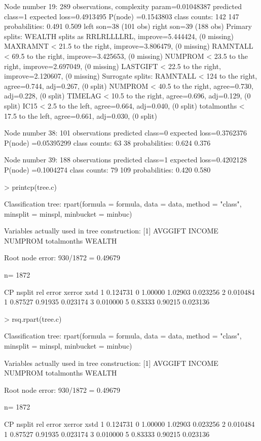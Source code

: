 \documentclass{article}
\begin{document}
\begin{Schunk}
\begin{Soutput}
Node number 19: 289 observations,    complexity param=0.01048387
  predicted class=1  expected loss=0.4913495  P(node) =0.1543803
    class counts:   142   147
   probabilities: 0.491 0.509 
  left son=38 (101 obs) right son=39 (188 obs)
  Primary splits:
      WEALTH   splits as  RRLRLLLLRL,   improve=5.444424, (0 missing)
      MAXRAMNT < 21.5     to the right, improve=3.806479, (0 missing)
      RAMNTALL < 69.5     to the right, improve=3.425653, (0 missing)
      NUMPROM  < 23.5     to the right, improve=2.697049, (0 missing)
      LASTGIFT < 22.5     to the right, improve=2.120607, (0 missing)
  Surrogate splits:
      RAMNTALL    < 124      to the right, agree=0.744, adj=0.267, (0 split)
      NUMPROM     < 40.5     to the right, agree=0.730, adj=0.228, (0 split)
      TIMELAG     < 10.5     to the right, agree=0.696, adj=0.129, (0 split)
      IC15        < 2.5      to the left,  agree=0.664, adj=0.040, (0 split)
      totalmonths < 17.5     to the left,  agree=0.661, adj=0.030, (0 split)

Node number 38: 101 observations
  predicted class=0  expected loss=0.3762376  P(node) =0.05395299
    class counts:    63    38
   probabilities: 0.624 0.376 

Node number 39: 188 observations
  predicted class=1  expected loss=0.4202128  P(node) =0.1004274
    class counts:    79   109
   probabilities: 0.420 0.580 
\end{Soutput}
\begin{Sinput}
> printcp(tree.c)
\end{Sinput}
\begin{Soutput}
Classification tree:
rpart(formula = formula, data = data, method = "class", minsplit = minspl, 
    minbucket = minbuc)

Variables actually used in tree construction:
[1] AVGGIFT     INCOME      NUMPROM     totalmonths WEALTH     

Root node error: 930/1872 = 0.49679

n= 1872 

        CP nsplit rel error  xerror     xstd
1 0.124731      0   1.00000 1.02903 0.023256
2 0.010484      1   0.87527 0.91935 0.023174
3 0.010000      5   0.83333 0.90215 0.023136
\end{Soutput}
\begin{Sinput}
> rsq.rpart(tree.c)
\end{Sinput}
\begin{Soutput}
Classification tree:
rpart(formula = formula, data = data, method = "class", minsplit = minspl, 
    minbucket = minbuc)

Variables actually used in tree construction:
[1] AVGGIFT     INCOME      NUMPROM     totalmonths WEALTH     

Root node error: 930/1872 = 0.49679

n= 1872 

        CP nsplit rel error  xerror     xstd
1 0.124731      0   1.00000 1.02903 0.023256
2 0.010484      1   0.87527 0.91935 0.023174
3 0.010000      5   0.83333 0.90215 0.023136
\end{Soutput}
\end{Schunk}
\end{document}
